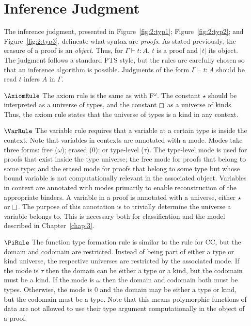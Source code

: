 \section{Inference Judgment}
\label{sec:2:judgments}

The inference judgment, presented in Figure~\ref{fig:2:typ1}; Figure~\ref{fig:2:typ2}; and Figure~\ref{fig:2:typ3}, delineate what syntax are \textit{proofs}.
As stated previously, the erasure of a proof is an \textit{object}.
Thus, for $\Gamma \vdash t : A$, $t$ is a proof and $|t|$ its object.
The judgment follows a standard PTS style, but the rules are carefully chosen so that an inference algorithm is possible.
Judgments of the form $\Gamma \vdash t : A$ should be read $t$ infers $A$ in $\Gamma$.

$\AxiomRule$ The axiom rule is the same as with F$^\omega$.
The constant $\star$ should be interpreted as a universe of types, and the constant $\kind$ as a universe of kinds.
Thus, the axiom rule states that the universe of types is a kind in any context.

$\VarRule$ The variable rule requires that a variable at a certain type is inside the context.
Note that variables in contexts are annotated with a mode.
Modes take three forms: free ($\omega$); erased ($0$); or type-level ($\tau$).
The type-level mode is used for proofs that exist inside the type universe; the free mode for proofs that belong to some type; and the erased mode for proofs that belong to some type but whose bound variable is not computationally relevant in the associated object.
Variables in context are annotated with modes primarily to enable reconstruction of the appropriate binders.
A variable in a proof is annotated with a universe, either $\star$ or $\kind$.
The purpose of this annotation is to trivially determine the universe a variable belongs to.
This is necessary both for classification and the model described in Chapter~\ref{chap:3}.




$\PiRule$ The function type formation rule is similar to the rule for CC, but the domain and codomain are restricted.
Instead of being part of either a type or kind universe, the respective universes are restricted by the associated mode.
If the mode is $\tau$ then the domain can be either a type or a kind, but the codomain must be a kind.
If the mode is $\omega$ then the domain and codomain both must be types.
Otherwise, the mode is $0$ and the domain may be either a type or kind, but the codomain must be a type.
Note that this means polymorphic functions of data are not allowed to use their type argument computationally in the object of a proof.

